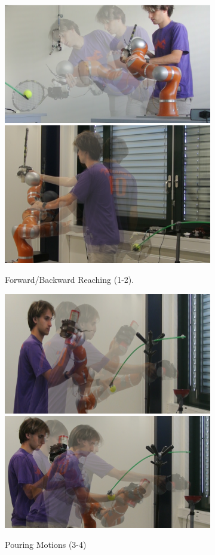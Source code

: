 \documentclass[letterpaper, 10 pt, journal, twoside, fleqn]{IEEEtran}
\begin{document}
\begin{figure}[!ht]
  \begin{minipage}[b]{0.31\textwidth}
	\centering	
		\begin{subfigure}[t]{\linewidth}
		\centering
			\includegraphics[width=0.5\linewidth]{../new-pics/forehand_crop.png}\hspace{5pt}\includegraphics[width=0.43\linewidth]{../new-pics/backhand_crop.png}
					\caption{Forward/Backward Reaching (1-2).\label{fig:forback}}
		\end{subfigure}
		\begin{subfigure}[t]{\linewidth}
\centering
	\includegraphics[width=0.45\linewidth]{../new-pics/pour-free_crop.png}\hspace{5pt}\includegraphics[width=0.477\linewidth]{../new-pics/pour-obst_crop.png}
						\caption{ Pouring Motions (3-4)}
			\end{subfigure}
			\begin{subfigure}[t]{\linewidth}		
\centering

\end{subfigure}
\end{minipage}
\end{figure}
\end{document}

